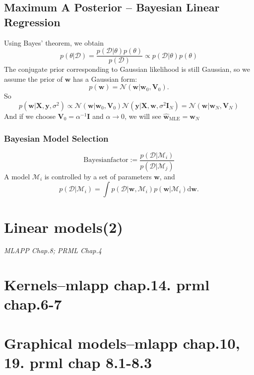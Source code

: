 \documentclass{article}
\newcommand{\norm}{\mathcal N}
\newcommand{\mbf}{\mathbf}
\newcommand{\mrm}{\mathrm}
\newcommand{\mcal}{\mathcal}
\begin{document}
\subsection*{Maximum A Posterior -- Bayesian Linear Regression}
Using Bayes' theorem, we obtain
\begin{equation}
    p(\theta|\mcal D) = \frac{p(\mcal D|\theta)p(\theta)}{p(\mcal D)} \propto p(\mcal D|\theta)p(\theta)
\end{equation}
The conjugate prior corresponding to Gaussian likelihood is still Gaussian, so we assume the prior of $\mbf w$ has a Gaussian form:
\begin{equation}
    p(\mbf w) = \norm (\mbf w|\mbf w_0,\mbf V_0).
\end{equation}
So 
\begin{equation}
    p(\mbf w|\mbf X,\mbf y, \sigma^2)\propto \norm(\mbf w|\mbf w_0,\mbf V_0)\norm(\mbf y|\mbf X,\mbf w,\sigma^2\mbf I_N) = \norm(\mbf w|\mbf w_N,\mbf V_N)
\end{equation}
And if we choose $\mbf V_0=\alpha^{-1}\mbf I$ and $\alpha\rightarrow 0$, we will see $\hat{\mbf w}_{\mrm{MLE}} = \mbf w_N$

\subsubsection*{Bayesian Model Selection}
\begin{equation}
    \mrm{Bayesian factor}:=\frac{p(\mcal D|\mcal M_i)}{p(\mcal D|\mcal M_j)}
\end{equation}
A model $\mcal M_i$ is controlled by a set of parameters $\mbf w$, and 
\begin{equation}
    p(\mcal D|\mcal M_i) = \int p(\mcal D|\mbf w,\mcal M_i)p(\mbf w|\mcal M_i)\mrm d\mbf w.
\end{equation}

\section{Linear models(2)}
\emph{MLAPP Chap.8; PRML Chap.4}

\section{Kernels--mlapp chap.14. prml chap.6-7}

\section{Graphical models--mlapp chap.10, 19. prml chap 8.1-8.3}
\end{document}
